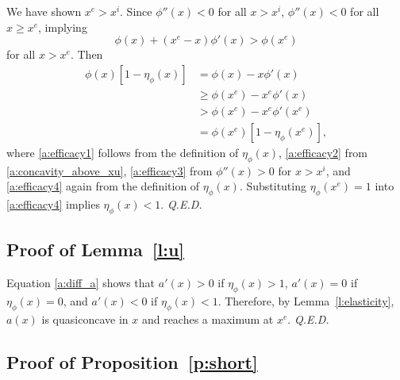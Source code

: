 \documentclass[12pt]{article}
\renewcommand{\qed}{{\it Q.E.D.}}
\newcommand{\efficacy}{\phi}
\newcommand{\average}{a}
\newcommand{\xunit}{x^{e}}
\newcommand{\poi}{x^{i}}
\newcommand{\elasticity}[1]{\eta_{#1}}
\begin{document}
We have shown $\xunit > \poi$. Since $\efficacy''(x) < 0$ for all $x >
\poi$, $\efficacy''(x) < 0$ for all $x \geq \xunit$, implying
\begin{equation}
\label{a:concavity_above_xu}
\efficacy(x) + (\xunit - x) \efficacy'(x) > \efficacy(\xunit)
\end{equation}
for all $x > \xunit$. Then
\begin{align}
\efficacy(x) \left[ 1 - \elasticity{\efficacy}(x) \right] & = \efficacy(x) - x \efficacy'(x) \label{a:efficacy1} \\
& \geq \efficacy(\xunit) - \xunit \efficacy'(x) \label{a:efficacy2} \\
& > \efficacy(\xunit) - \xunit \efficacy'(\xunit) \label{a:efficacy3} \\
& = \efficacy(\xunit) \left[ 1 - \elasticity{\efficacy}(\xunit) \right], \label{a:efficacy4}
\end{align}
where \eqref{a:efficacy1} follows from the definition of
$\elasticity{\efficacy}(x)$, \eqref{a:efficacy2} from
\eqref{a:concavity_above_xu}, \eqref{a:efficacy3} from $\efficacy''(x)
> 0$ for $x > \poi$, and \eqref{a:efficacy4} again from the definition
of $\elasticity{\efficacy}(x)$. Substituting
$\elasticity{\efficacy}(\xunit) = 1$ into \eqref{a:efficacy4} implies
$\elasticity{\efficacy}(x) < 1$. \qed


\subsection*{Proof of Lemma~\ref{l:u}}

Equation \eqref{a:diff_a} shows that $\average'(x) > 0$ if $\elasticity{\efficacy}(x) > 1$, $\average'(x) = 0$ if $\elasticity{\efficacy}(x) = 0$, and $\average'(x) < 0 $ if $\elasticity{\efficacy}(x) < 1$. Therefore, by Lemma~\ref{l:elasticity}, $\average(x)$ is quasiconcave in $x$ and reaches a maximum at $\xunit$. \qed


\subsection*{Proof of Proposition~\ref{p:short}}
\end{document}
